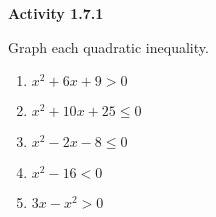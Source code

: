 \noindent\textbf{Activity 1.7.1}


Graph each quadratic inequality. 
\begin{multicols}{2}
\begin{enumerate}[label = \color{blue}\arabic*. ]
\item $ x^{2} + 6x + 9 > 0 $
\item $ x^{2} + 10x + 25 \leq 0 $
\item $ x^{2} - 2x - 8 \leq 0 $
\item $ x^{2} - 16 < 0 $
\item $ 3x - x^{2} > 0 $
\end{enumerate}
\end{multicols} 